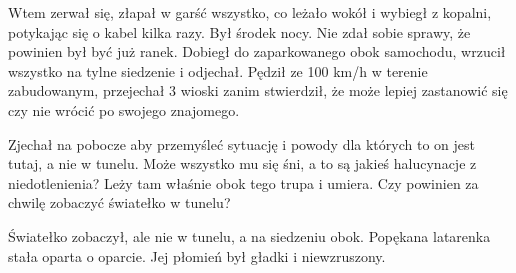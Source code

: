 Wtem zerwał się, złapał w garść wszystko, co leżało wokół i wybiegł z kopalni, potykając się o kabel kilka razy.
Był środek nocy. 
Nie zdał sobie sprawy, że powinien był być już ranek.
Dobiegł do zaparkowanego obok samochodu, wrzucił wszystko na tylne siedzenie i odjechał.
Pędził ze 100 km/h w terenie zabudowanym, przejechał 3 wioski zanim stwierdził, że może lepiej zastanowić się czy nie wrócić po swojego znajomego.

Zjechał na pobocze aby przemyśleć sytuację i powody dla których to on jest tutaj, a nie w tunelu.
Może wszystko mu się śni, a to są jakieś halucynacje z niedotlenienia?
Leży tam właśnie obok tego trupa i umiera.
Czy powinien za chwilę zobaczyć światełko w tunelu?

Światełko zobaczył, ale nie w tunelu, a na siedzeniu obok.
Popękana latarenka stała oparta o oparcie. Jej płomień był gładki i niewzruszony.
